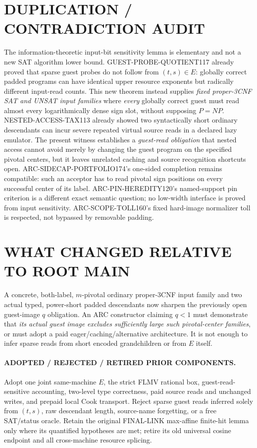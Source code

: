 \documentclass[11pt]{article}
\begin{document}
\section{DUPLICATION / CONTRADICTION AUDIT}
The information-theoretic input-bit sensitivity lemma is
elementary and not a new SAT algorithm lower bound.
GUEST-PROBE-QUOTIENT117 already proved that sparse
guest probes do not follow from $(t,s)\in E$:
globally correct padded programs can have identical upper
resource exponents but radically different input-read counts.
This new theorem instead supplies \emph{fixed proper-3CNF
SAT and UNSAT input families} where \emph{every} globally
correct guest must read almost every logarithmically dense
sign slot, without supposing $P=NP$.
NESTED-ACCESS-TAX113 already showed two syntactically
short ordinary descendants can incur severe repeated
virtual source reads in a declared lazy emulator.
The present witness establishes a \emph{guest-read
obligation} that nested access cannot avoid merely by
changing the guest program on the specified pivotal
centers, but it leaves unrelated caching and source
recognition shortcuts open.
ARC-SIDECAP-PORTFOLIO174's one-sided completion remains
compatible: such an acceptor has to read pivotal
sign positions on every successful center of its label.
ARC-PIN-HEREDITY120's named-support pin criterion
is a different exact semantic question; no low-width
interface is proved from input sensitivity.
ARC-SCOPE-TOLL160's fixed hard-image normalizer
toll is respected, not bypassed by removable padding.

\section{WHAT CHANGED RELATIVE TO ROOT MAIN}
A concrete, both-label, $m$-pivotal ordinary proper-3CNF
input family and two actual typed, power-short padded
descendants now sharpen the previously open
guest-image $q$ obligation.
An ARC constructor claiming $q<1$ must demonstrate
that \emph{its actual guest image excludes sufficiently
large such pivotal-center families}, or must adopt a
paid eager/caching/alternative architecture.
It is not enough to infer sparse reads from short
encoded grandchildren or from $E$ itself.

\paragraph{ADOPTED / REJECTED / RETIRED PRIOR COMPONENTS.}
Adopt one joint same-machine $E$, the strict FLMV
rational box, guest-read-sensitive accounting,
two-level type correctness, paid source reads and
unchanged writes, and prepaid local Cook transport.
Reject sparse guest reads inferred solely from
$(t,s)$, raw descendant length, source-name
forgetting, or a free SAT/status oracle.
Retain the original FINAL-LINK max-affine finite-hit
lemma only where its quantified hypotheses are met;
retire its old universal cosine endpoint and
all cross-machine resource splicing.
\end{document}
